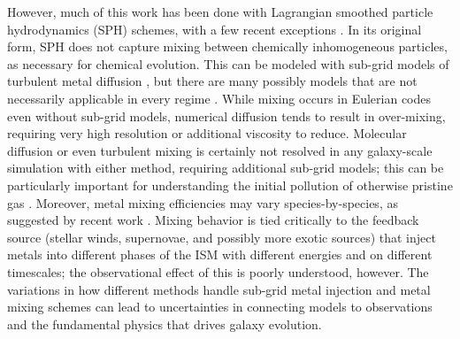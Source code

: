 \documentclass[twocolumn]{aastex61}
\begin{document}

However, much of this work has been done with Lagrangian smoothed particle hydrodynamics (SPH) schemes, with a few recent exceptions  \citep{Few2012,Few2014,Vorobyov2015}. In its original form, SPH does not capture mixing between chemically inhomogeneous particles, as necessary for chemical evolution. This can be modeled with sub-grid models of turbulent metal diffusion \citep[e.g.][]{Shen2010,Shen2013,Brook2014,Su2017a,Escala2018}, but there are many possibly models that are not necessarily applicable in every regime \citep[see ][]{Revaz2016}. While mixing occurs in Eulerian codes even without sub-grid models, numerical diffusion tends to result in over-mixing, requiring very high resolution or additional viscosity to reduce. Molecular diffusion or even turbulent mixing is certainly not resolved in any galaxy-scale simulation with either method, requiring additional sub-grid models; this can be particularly important for understanding the initial pollution of otherwise pristine gas \citep[see ][ and references therein]{PanScannapiecoScalo2013,Sarmento2017}. Moreover, metal mixing efficiencies may vary species-by-species, as suggested by recent work \citep[e.g.][]{Cohen2013, Roederer2014, FrebelNorris2015, Hirai2017, Cote2017}. Mixing behavior is tied critically to the feedback source (stellar winds, supernovae, and possibly more exotic sources) that inject metals into different phases of 
the ISM with different energies and on different timescales; the observational effect of this is poorly understood, however. The variations in how different methods handle sub-grid metal injection and metal mixing schemes can lead to uncertainties in connecting models to observations and the fundamental physics that drives galaxy evolution.
\end{document}

